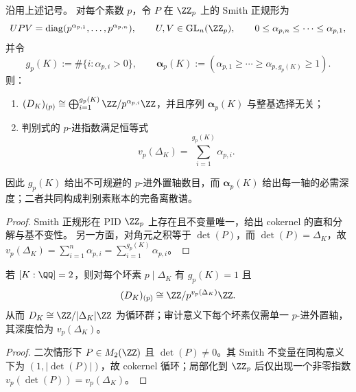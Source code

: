 \begin{theorem}\label{thm:xi-disc-ledger-axis-depth-smith}
沿用上述记号。
对每个素数 \(p\)，令 \(P\) 在 \(\ZZ_p\) 上的 Smith 正规形为
\[
UPV=\operatorname{diag}(p^{\alpha_{p,1}},\dots,p^{\alpha_{p,n}}),
\qquad
U,V\in \operatorname{GL}_n(\ZZ_p),
\qquad
0\le \alpha_{p,n}\le\cdots\le \alpha_{p,1},
\]
并令
\[
g_p(K):=\#\{i:\alpha_{p,i}>0\},\qquad
\boldsymbol{\alpha}_p(K):=(\alpha_{p,1}\ge\cdots\ge\alpha_{p,g_p(K)}\ge 1).
\]
则：
\begin{enumerate}
  \item \((D_K)_{(p)}\cong \bigoplus_{i=1}^{g_p(K)}\ZZ/p^{\alpha_{p,i}}\ZZ\)，并且序列 \(\boldsymbol{\alpha}_p(K)\) 与整基选择无关；
  \item 判别式的 \(p\)-进指数满足恒等式
  \[
  v_p(\Delta_K)=\sum_{i=1}^{g_p(K)}\alpha_{p,i}.
  \]
\end{enumerate}
因此 \(g_p(K)\) 给出不可规避的 \(p\)-进外置轴数目，而 \(\boldsymbol{\alpha}_p(K)\) 给出每一轴的必需深度；二者共同构成判别素账本的完备离散谱。
\end{theorem}
\begin{proof}
Smith 正规形在 PID \(\ZZ_p\) 上存在且不变量唯一，给出 cokernel 的直和分解与基不变性。
另一方面，对角元之积等于 \(\det(P)\)，而 \(\det(P)=\Delta_K\)，故
\(
v_p(\Delta_K)=\sum_{i=1}^{n}\alpha_{p,i}
=\sum_{i=1}^{g_p(K)}\alpha_{p,i}
\)。
\end{proof}

\begin{corollary}[二次数域的循环判别账本]\label{cor:xi-disc-ledger-quadratic-cyclic}
若 \([K:\QQ]=2\)，则对每个坏素 \(p\mid \Delta_K\) 有 \(g_p(K)=1\) 且
\[
(D_K)_{(p)}\cong \ZZ/p^{v_p(\Delta_K)}\ZZ.
\]
从而 \(D_K\cong \ZZ/|\Delta_K|\ZZ\) 为循环群；审计意义下每个坏素仅需单一 \(p\)-进外置轴，其深度恰为 \(v_p(\Delta_K)\)。
\end{corollary}
\begin{proof}
二次情形下 \(P\in M_2(\ZZ)\) 且 \(\det(P)\neq 0\)。其 Smith 不变量在同构意义下为 \((1,|\det(P)|)\)，故 cokernel 循环；局部化到 \(\ZZ_p\) 后仅出现一个非零指数 \(v_p(\det(P))=v_p(\Delta_K)\)。
\end{proof}

